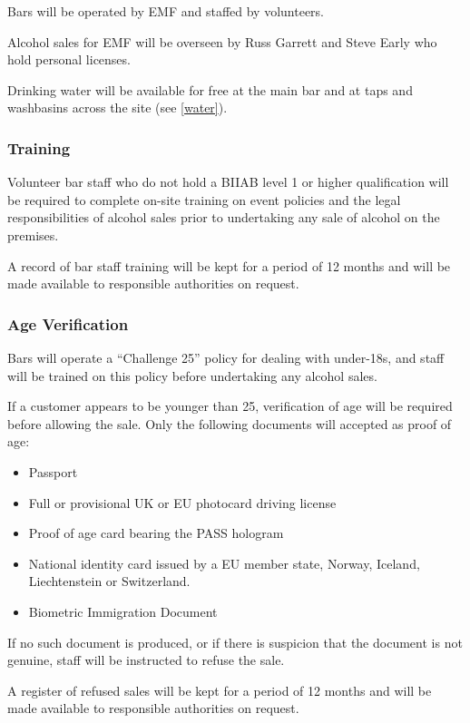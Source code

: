 Bars will be operated by EMF and staffed by volunteers.

Alcohol sales for EMF will be overseen by Russ Garrett and Steve Early who
hold personal licenses.

Drinking water will be available for free at the main bar and at taps and washbasins
across the site (see \cref{water}).

\subsubsection{Training}

Volunteer bar staff who do not hold a BIIAB level 1 or higher qualification will
be required to complete on-site training on event policies and the legal
responsibilities of alcohol sales prior to undertaking any sale of alcohol on the premises.

A record of bar staff training will be kept for a period of 12 months and
will be made available to responsible authorities on request.

\subsubsection{Age Verification}

Bars will operate a ``Challenge 25'' policy for dealing with under-18s, and staff
will be trained on this policy before undertaking any alcohol sales.

If a customer appears to be younger than 25, verification of age will be required
before allowing the sale. Only the following documents will accepted as proof of age:

\begin{itemize}
    \tightlist
    \item Passport
    \item Full or provisional UK or EU photocard driving license
    \item Proof of age card bearing the PASS hologram
    \item National identity card issued by a EU member state, Norway,
          Iceland, Liechtenstein or Switzerland.
    \item Biometric Immigration Document
\end{itemize}

If no such document is produced, or if there is suspicion that the document
is not genuine, staff will be instructed to refuse the sale.

A register of refused sales will be kept for a period of 12 months and will
be made available to responsible authorities on request.

